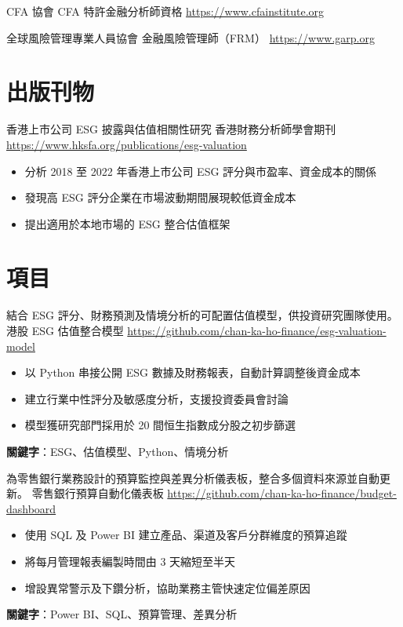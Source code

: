 \documentclass[a4paper, serif, 10pt]{moderncv}
\begin{document}
        {CFA 協會}
        {CFA 特許金融分析師資格}
        {\url{https://www.cfainstitute.org}}
        {}
        {}

        {全球風險管理專業人員協會}
        {金融風險管理師（FRM）}
        {\url{https://www.garp.org}}
        {}
        {}
\section{出版刊物}

        {香港上市公司 ESG 披露與估值相關性研究}
        {香港財務分析師學會期刊}
        {\url{https://www.hksfa.org/publications/esg-valuation}}
        {}
        {\begin{itemize}
\item 分析 2018 至 2022 年香港上市公司 ESG 評分與市盈率、資金成本的關係
\item 發現高 ESG 評分企業在市場波動期間展現較低資金成本
\item 提出適用於本地市場的 ESG 整合估值框架
\end{itemize}}
\section{項目}

        {結合 ESG 評分、財務預測及情境分析的可配置估值模型，供投資研究團隊使用。}
        {港股 ESG 估值整合模型}
        {\url{https://github.com/chan-ka-ho-finance/esg-valuation-model}}
        {}
        {\begin{itemize}
\item 以 Python 串接公開 ESG 數據及財務報表，自動計算調整後資金成本
\item 建立行業中性評分及敏感度分析，支援投資委員會討論
\item 模型獲研究部門採用於 20 間恒生指數成分股之初步篩選
\end{itemize}
\textbf{關鍵字}：ESG、估值模型、Python、情境分析}

        {為零售銀行業務設計的預算監控與差異分析儀表板，整合多個資料來源並自動更新。}
        {零售銀行預算自動化儀表板}
        {\url{https://github.com/chan-ka-ho-finance/budget-dashboard}}
        {}
        {\begin{itemize}
\item 使用 SQL 及 Power BI 建立產品、渠道及客戶分群維度的預算追蹤
\item 將每月管理報表編製時間由 3 天縮短至半天
\item 增設異常警示及下鑽分析，協助業務主管快速定位偏差原因
\end{itemize}
\textbf{關鍵字}：Power BI、SQL、預算管理、差異分析}
\end{document}
